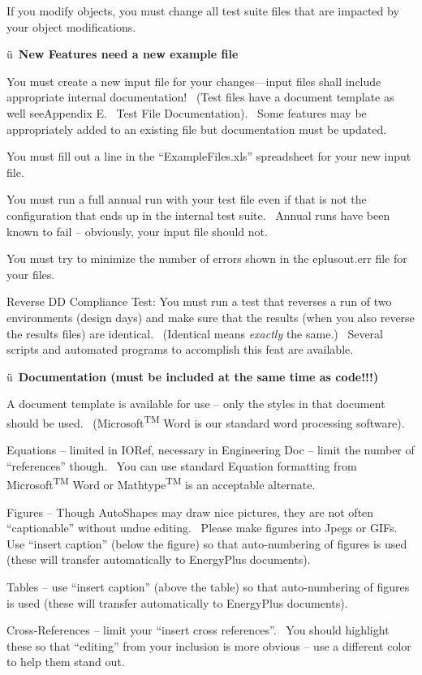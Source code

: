 If you modify objects, you must change all test suite files that are impacted by your object modifications.

ü~\textbf{New Features need a new example file}

You must create a new input file for your changes---input files shall include appropriate internal documentation!~ (Test files have a document template as well seeAppendix E.~ Test File Documentation).~ Some features may be appropriately added to an existing file but documentation must be updated.

You must fill out a line in the ``ExampleFiles.xls'' spreadsheet for your new input file.

You must run a full annual run with your test file even if that is not the configuration that ends up in the internal test suite.~ Annual runs have been known to fail -- obviously, your input file should not.

You must try to minimize the number of errors shown in the eplusout.err file for your files.

Reverse DD Compliance Test: You must run a test that reverses a run of two environments (design days) and make sure that the results (when you also reverse the results files) are identical.~ (Identical means \emph{exactly} the same.)~ Several scripts and automated programs to accomplish this feat are available.

ü~\textbf{Documentation (must be included at the same time as code!!!)}

A document template is available for use -- only the styles in that document should be used.~ (Microsoft\textsuperscript{TM} Word is our standard word processing software).

Equations -- limited in IORef, necessary in Engineering Doc -- limit the number of ``references'' though.~ You can use standard Equation formatting from Microsoft\textsuperscript{TM} Word or Mathtype\textsuperscript{TM} is an acceptable alternate.

Figures -- Though AutoShapes may draw nice pictures, they are not often ``captionable'' without undue editing.~ Please make figures into Jpegs or GIFs.~ Use ``insert caption'' (below the figure) so that auto-numbering of figures is used (these will transfer automatically to EnergyPlus documents).

Tables -- use ``insert caption'' (above the table) so that auto-numbering of figures is used (these will transfer automatically to EnergyPlus documents).

Cross-References -- limit your ``insert cross references''.~ You should highlight these so that ``editing'' from your inclusion is more obvious -- use a different color to help them stand out.

